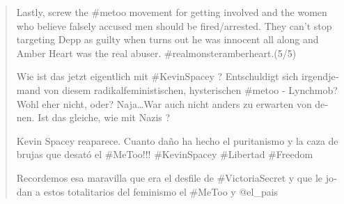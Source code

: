 \documentclass[output=paper,english,spanish,german,english]{langsci/langscibook}
\begin{document}
\begin{quote}\sffamily
  Lastly, screw the \#metoo movement for getting involved and the women who believe falsely accused men should be fired\slash arrested. They can't stop targeting Depp as guilty when turns out he was innocent all along and Amber Heart was the real abuser. \#realmonsteramberheart.(5/5)

  \foreignlanguage{german}{Wie ist das jetzt eigentlich mit \#KevinSpacey ? Entschuldigt sich irgendjemand von diesem radikalfeministischen, hysterischen \#metoo - Lynchmob? Wohl eher nicht, oder? Naja\dots War auch nicht anders zu erwarten von denen. Ist das gleiche, wie mit Nazis ?}

  \foreignlanguage{spanish}{Kevin Spacey reaparece. Cuanto daño ha hecho el puritanismo y la caza de brujas que desató el \#MeToo!!! \#KevinSpacey \#Libertad \#Freedom}

  \foreignlanguage{spanish}{Recordemos esa maravilla que era el desfile de \#VictoriaSecret y que le jodan a estos totalitarios del feminismo el \#MeToo y @el\_pais}
\end{quote}

%
%
%
\end{document}
